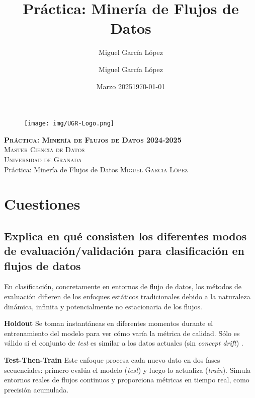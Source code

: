 \documentclass[12pt,letterpaper]{article}
\title{Práctica: Minería de Flujos de Datos}
\author{Miguel García López}
\date{Marzo 2025}
\author{Miguel García López} %
\date{\normalsize\today} %
\begin{document}
\begin{titlepage}
    \begin{figure}
        \vspace{-1.3cm}
        \begin{center}
            \texttt{[image: img/UGR-Logo.png]}
        \end{center}
    \end{figure}
    \vspace{1.3cm}
    \centering
    \normalfont \normalsize
    \textsc{\textbf{Práctica: Minería de Flujos de Datos 2024-2025} \\ \vspace{.15cm} Master Ciencia de Datos\\ \vspace{.15cm} Universidad de Granada} \\ [25pt]
    \huge Práctica: Minería de Flujos de Datos
    \normalfont \normalsize \vspace{.30cm}
    \textsc{Miguel García López}

\end{titlepage}

\tableofcontents
\listoffigures
\listoftables
\newpage

\section{Cuestiones}
\subsection{Explica en qué consisten los diferentes modos de evaluación/validación para clasificación en flujos de datos}

En clasificación, concretamente en entornos de flujo de datos, los métodos de evaluación difieren de los enfoques estáticos tradicionales debido a la naturaleza dinámica, infinita y potencialmente no estacionaria de los flujos.

\textbf{Holdout}
Se toman instantáneas en diferentes momentos durante el entrenamiento del modelo para ver cómo varía la métrica de calidad. Sólo es válido si el conjunto de \textit{test} es similar a los datos actuales (sin \textit{concept drift}) \cite{Casillas2025}.

\textbf{Test-Then-Train}
Este enfoque procesa cada nuevo dato en dos fases secuenciales: primero evalúa el modelo (\textit{test}) y luego lo actualiza (\textit{train}). Simula entornos reales de flujos continuos y proporciona métricas en tiempo real, como precisión acumulada.
\end{document}
